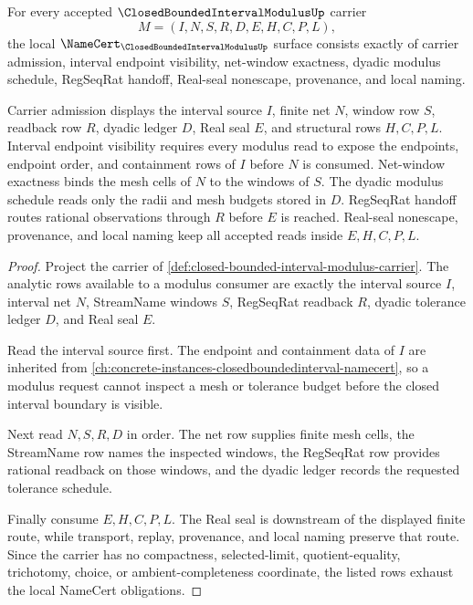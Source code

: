 \begin{theorem}
\label{thm:closed-bounded-interval-modulus-namecert-obligations}
For every accepted $\ClosedBoundedIntervalModulusUp$ carrier
$$
M=(I,N,S,R,D,E,H,C,P,L),
$$
the local $\NameCert_{\ClosedBoundedIntervalModulusUp}$ surface consists exactly of carrier admission, interval endpoint visibility, net-window exactness, dyadic modulus schedule, RegSeqRat handoff, Real-seal nonescape, provenance, and local naming.

Carrier admission displays the interval source $I$, finite net $N$, window row $S$, readback row $R$, dyadic ledger $D$, Real seal $E$, and structural rows $H,C,P,L$. Interval endpoint visibility requires every modulus read to expose the endpoints, endpoint order, and containment rows of $I$ before $N$ is consumed. Net-window exactness binds the mesh cells of $N$ to the windows of $S$. The dyadic modulus schedule reads only the radii and mesh budgets stored in $D$. RegSeqRat handoff routes rational observations through $R$ before $E$ is reached. Real-seal nonescape, provenance, and local naming keep all accepted reads inside $E,H,C,P,L$.
\end{theorem}
\begin{proof}
Project the carrier of \autoref{def:closed-bounded-interval-modulus-carrier}. The analytic rows available to a modulus consumer are exactly the interval source $I$, interval net $N$, StreamName windows $S$, RegSeqRat readback $R$, dyadic tolerance ledger $D$, and Real seal $E$.

Read the interval source first. The endpoint and containment data of $I$ are inherited from \autoref{ch:concrete-instances-closedboundedinterval-namecert}, so a modulus request cannot inspect a mesh or tolerance budget before the closed interval boundary is visible.

Next read $N,S,R,D$ in order. The net row supplies finite mesh cells, the StreamName row names the inspected windows, the RegSeqRat row provides rational readback on those windows, and the dyadic ledger records the requested tolerance schedule.

Finally consume $E,H,C,P,L$. The Real seal is downstream of the displayed finite route, while transport, replay, provenance, and local naming preserve that route. Since the carrier has no compactness, selected-limit, quotient-equality, trichotomy, choice, or ambient-completeness coordinate, the listed rows exhaust the local NameCert obligations.
\end{proof}

